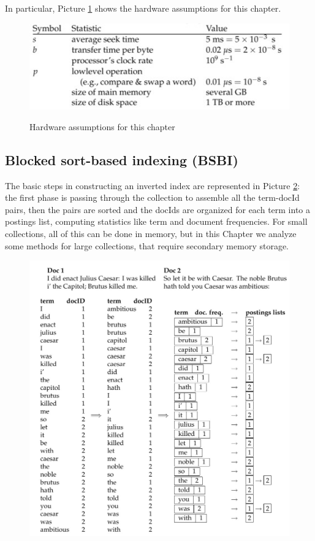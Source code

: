 In particular, Picture \ref{assumptions} shows the hardware assumptions for this chapter.

\begin{figure}[h!]
		\centering
		\includegraphics[scale = 1.8]{img/assumptions.jpg}
		\label{assumptions}
        \caption{Hardware assumptions for this chapter}
\end{figure}

\subsection{Blocked sort-based indexing (BSBI)}
The basic steps in constructing an inverted index are represented in Picture \ref{inc_ex}: the first phase is passing through the collection to assemble all the term-docId pairs, then the pairs are sorted and the docIds are organized for each term into a postings list, computing statistics like term and document frequencies. For small collections, all of this can be done in memory, but in this Chapter we analyze some methods for large collections, that require secondary memory storage.

\begin{figure}[h!]
		\centering
		\includegraphics[scale = 0.8]{img/example_inverted index.jpg}
		\label{inc_ex}
\end{figure}

